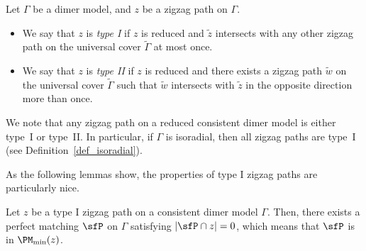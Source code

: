 \begin{Definition}\label{def_zigzag_type}
Let $\Gamma$ be a dimer model, and $z$ be a zigzag path on $\Gamma$.
\begin{itemize}\itemsep=0pt
\item[(1)] We say that $z$ is \emph{type I} if $z$ is reduced and $\widetilde{z}$ intersects with any other zigzag path on the universal cover $\widetilde{\Gamma}$ at most once.
\item[(2)] We say that $z$ is \emph{type II} if $z$ is reduced and there exists a zigzag path $\widetilde{w}$ on the universal cover $\widetilde{\Gamma}$ such that $\widetilde{w}$ intersects with $\widetilde{z}$ in the opposite direction more than once.
\end{itemize}
We note that any zigzag path on a reduced consistent dimer model is either type~I or type~II.
In particular, if $\Gamma$ is isoradial, then all zigzag paths are type~I (see Definition~\ref{def_isoradial}).
\end{Definition}

As the following lemmas show, the properties of type I zigzag paths are particularly nice.

\begin{Lemma}\label{lem_existence_pm}
Let $z$ be a type I zigzag path on a consistent dimer model $\Gamma$.
Then, there exists a perfect matching $\sfP$ on $\Gamma$ satisfying $|\sfP\cap z|=0$, which means that $\sfP$ is in $\PM_{\min}(z)$.
\end{Lemma}

